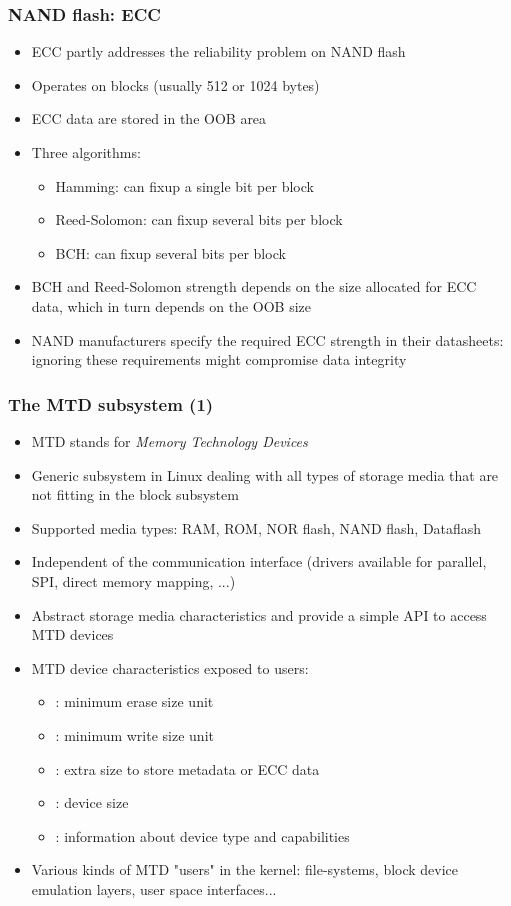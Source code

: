 \begin{frame}
  \frametitle{NAND flash: ECC}
  \begin{itemize}
  \item ECC partly addresses the reliability problem on NAND flash
  \item Operates on blocks (usually 512 or 1024 bytes)
  \item ECC data are stored in the OOB area
  \item Three algorithms:
    \begin{itemize}
    \item Hamming: can fixup a single bit per block
    \item Reed-Solomon: can fixup several bits per block
    \item BCH: can fixup several bits per block
    \end{itemize}
  \item BCH and Reed-Solomon strength depends on the size allocated
    for ECC data, which in turn depends on the OOB size
  \item NAND manufacturers specify the required ECC strength in their
    datasheets: ignoring these requirements might compromise data
    integrity
  \end{itemize}
\end{frame}

\begin{frame}
  \frametitle{The MTD subsystem (1)}
  \begin{itemize}
  \item MTD stands for {\em Memory Technology Devices}
  \item Generic subsystem in Linux dealing with all types of storage media that
    are not fitting in the block subsystem
  \item Supported media types: RAM, ROM, NOR flash, NAND flash,
    Dataflash
  \item Independent of the communication interface (drivers available
    for parallel, SPI, direct memory mapping, ...)
  \item Abstract storage media characteristics and provide a simple
    API to access MTD devices
  \item MTD device characteristics exposed to users:
    \begin{itemize}
    \item {}: minimum erase size unit
    \item {}: minimum write size unit
    \item {}: extra size to store metadata or ECC data
    \item {}: device size
    \item {}: information about device type and capabilities
    \end{itemize}
  \item Various kinds of MTD "users" in the kernel: file-systems, block
    device emulation layers, user space interfaces...
  \end{itemize}
\end{frame}

